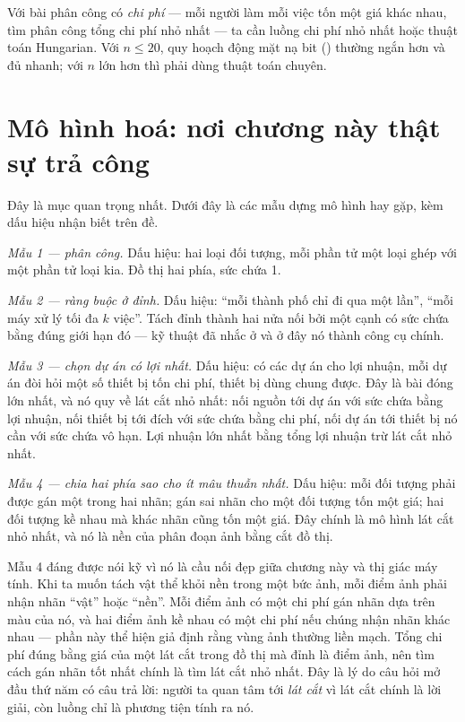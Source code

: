 \documentclass[../../algorithm.tex]{subfiles}
\begin{document}
Với bài phân công có \emph{chi phí} --- mỗi người làm mỗi việc tốn một giá khác nhau, tìm phân công tổng chi phí nhỏ nhất --- ta cần luồng chi phí nhỏ nhất hoặc thuật toán Hungarian\cite{kuhn1955}. Với \(n \le 20\), quy hoạch động mặt nạ bit () thường ngắn hơn và đủ nhanh; với \(n\) lớn hơn thì phải dùng thuật toán chuyên.

\section{Mô hình hoá: nơi chương này thật sự trả công}

Đây là mục quan trọng nhất. Dưới đây là các mẫu dựng mô hình hay gặp, kèm dấu hiệu nhận biết trên đề.

\emph{Mẫu 1 --- phân công.} Dấu hiệu: hai loại đối tượng, mỗi phần tử một loại ghép với một phần tử loại kia. Đồ thị hai phía, sức chứa 1.

\emph{Mẫu 2 --- ràng buộc ở đỉnh.} Dấu hiệu: ``mỗi thành phố chỉ đi qua một lần'', ``mỗi máy xử lý tối đa \(k\) việc''. Tách đỉnh thành hai nửa nối bởi một cạnh có sức chứa bằng đúng giới hạn đó --- kỹ thuật đã nhắc ở  và ở đây nó thành công cụ chính.

\emph{Mẫu 3 --- chọn dự án có lợi nhất.} Dấu hiệu: có các dự án cho lợi nhuận, mỗi dự án đòi hỏi một số thiết bị tốn chi phí, thiết bị dùng chung được. Đây là bài đóng lớn nhất, và nó quy về lát cắt nhỏ nhất: nối nguồn tới dự án với sức chứa bằng lợi nhuận, nối thiết bị tới đích với sức chứa bằng chi phí, nối dự án tới thiết bị nó cần với sức chứa vô hạn. Lợi nhuận lớn nhất bằng tổng lợi nhuận trừ lát cắt nhỏ nhất.

\emph{Mẫu 4 --- chia hai phía sao cho ít mâu thuẫn nhất.} Dấu hiệu: mỗi đối tượng phải được gán một trong hai nhãn; gán sai nhãn cho một đối tượng tốn một giá; hai đối tượng kề nhau mà khác nhãn cũng tốn một giá. Đây chính là mô hình lát cắt nhỏ nhất, và nó là nền của phân đoạn ảnh bằng cắt đồ thị.

Mẫu 4 đáng được nói kỹ vì nó là cầu nối đẹp giữa chương này và thị giác máy tính. Khi ta muốn tách vật thể khỏi nền trong một bức ảnh, mỗi điểm ảnh phải nhận nhãn ``vật'' hoặc ``nền''. Mỗi điểm ảnh có một chi phí gán nhãn dựa trên màu của nó, và hai điểm ảnh kề nhau có một chi phí nếu chúng nhận nhãn khác nhau --- phần này thể hiện giả định rằng vùng ảnh thường liền mạch. Tổng chi phí đúng bằng giá của một lát cắt trong đồ thị mà đỉnh là điểm ảnh, nên tìm cách gán nhãn tốt nhất chính là tìm lát cắt nhỏ nhất. Đây là lý do câu hỏi mở đầu thứ năm có câu trả lời: người ta quan tâm tới \emph{lát cắt} vì lát cắt chính là lời giải, còn luồng chỉ là phương tiện tính ra nó.
\end{document}
